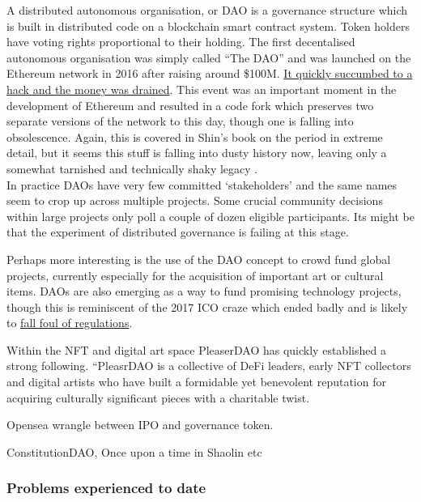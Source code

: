 A distributed autonomous organisation, or DAO is a governance structure which is built in distributed code on a blockchain smart contract system. Token holders have voting rights proportional to their holding. The first decentalised autonomous organisation was simply called ``The DAO'' and was launched on the Ethereum network in 2016 after raising around \$100M. \href{https://www.gemini.com/cryptopedia/the-dao-hack-makerdao#section-what-is-a-dao}{It quickly succumbed to a hack and the money was drained}. This event was an important moment in the development of Ethereum and resulted in a code fork which preserves two separate versions of the network to this day, though one is falling into obsolescence. Again, this is covered in Shin's book on the period in extreme detail, but it seems this stuff is falling into dusty history now, leaving only a somewhat tarnished and technically shaky legacy \cite{cryptopians}. \\
In practice DAOs have very few committed `stakeholders' and the same names seem to crop up across multiple projects. Some crucial community decisions within large projects only poll a couple of dozen eligible participants. Its might be that the experiment of distributed governance is failing at this stage. \par
Perhaps more interesting is the use of the DAO concept to crowd fund global projects, currently especially for the acquisition of important art or cultural items. DAOs are also emerging as a way to fund promising technology projects, though this is reminiscent of the 2017 ICO craze which ended badly and is likely to \href{https://www.cftc.gov/PressRoom/PressReleases/8590-22}{fall foul of regulations}.\par
Within the NFT and digital art space  PleaserDAO has quickly established a strong following.
``PleasrDAO is a collective of DeFi leaders, early NFT collectors and digital artists who have built a formidable yet benevolent reputation for acquiring culturally significant pieces with a charitable twist.\par
Opensea wrangle between IPO and governance token.\par
ConstitutionDAO, Once upon a time in Shaolin etc 

\subsubsection{Problems experienced to date}

